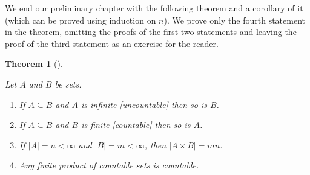 \documentclass[10pt,]{book}
\theoremstyle{plain}
\newtheorem{theorem}{Theorem}[section]
\theoremstyle{definition}
\theoremstyle{definition}
\theoremstyle{definition}
\theoremstyle{definition}
\numberwithin{equation}{section}
\newcommand{\lt}{ < }
\begin{document}
    We end our preliminary chapter with the following theorem and a corollary of it (which can be proved using induction on \(n\)). We prove only the fourth statement in the theorem, omitting the proofs of the first two statements and leaving the proof of the third statement as an exercise for the reader.
\begin{theorem}[{}]\label{cardthm}

        Let \(A\) and \(B\) be sets.
        \leavevmode%
\begin{enumerate}
\item\hypertarget{li-19}{}
              If \(A\subseteq B\) and \(A\) is infinite [uncountable] then so is \(B\).
\item\hypertarget{li-20}{}
              If \(A\subseteq B\) and \(B\) is finite [countable] then so is \(A\).
\item\hypertarget{li-21}{}
              If \(|A|=n\lt \infty\) and \(|B|=m\lt  \infty\), then \(|A\times B|=mn\).
\item\hypertarget{li-22}{}
              Any finite product of countable sets is countable.%
\end{enumerate}

\end{theorem}
\end{document}
